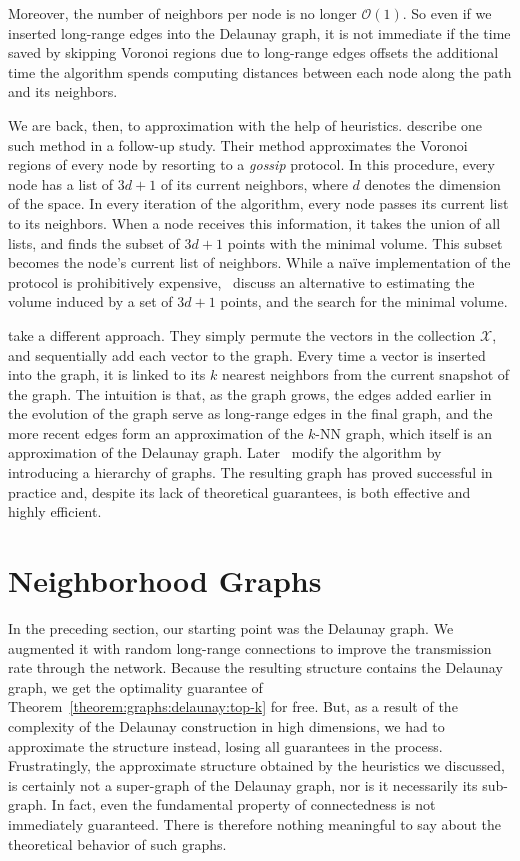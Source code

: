 \begin{svgraybox}
Moreover, the number of
neighbors per node is no longer $\mathcal{O}(1)$. So even if we inserted
long-range edges into the Delaunay graph, it is not immediate if the time
saved by skipping Voronoi regions due to long-range edges
offsets the additional time the algorithm
spends computing distances between each node along the path and its neighbors.
\end{svgraybox}

We are back, then, to approximation with the help of heuristics.
\cite{raynet2007} describe one such method in a follow-up study.
Their method approximates the Voronoi regions of every node by
resorting to a \emph{gossip} protocol. In this procedure, every node
has a list of $3d + 1$ of its current neighbors, where $d$ denotes the dimension
of the space. In every iteration of the algorithm,
every node passes its current list to its neighbors. When a node receives
this information, it takes the union of all lists, and finds the subset of
$3d + 1$ points with the minimal volume. This subset becomes the node's
current list of neighbors. While a na\"ive implementation of the protocol
is prohibitively expensive,~\cite{raynet2007} discuss an alternative to estimating
the volume induced by a set of $3d + 1$ points, and the search for the minimal volume.

\cite{nsw2014} take a different approach. They simply permute the vectors
in the collection $\mathcal{X}$, and sequentially add each vector to the graph. Every time
a vector is inserted into the graph, it is linked to its $k$ nearest neighbors
from the current snapshot of the graph.
The intuition is that, as the graph grows, the edges added earlier in the evolution
of the graph serve as long-range edges in the final graph,
and the more recent edges form an approximation
of the $k$-NN graph, which itself is an approximation of the Delaunay graph.
Later~\cite{hnsw2020} modify the algorithm by introducing a hierarchy of graphs.
The resulting graph has proved successful in practice and, despite its lack
of theoretical guarantees, is both effective and highly efficient.

\section{Neighborhood Graphs}

In the preceding section, our starting point was the Delaunay graph. We augmented it with
random long-range connections to improve the transmission rate through the network.
Because the resulting structure contains the Delaunay
graph, we get the optimality guarantee of Theorem~\ref{theorem:graphs:delaunay:top-k}
for free. But, as a result of the complexity of the Delaunay construction in high dimensions,
we had to approximate the structure instead, losing all guarantees in the process.
Frustratingly, the approximate structure obtained by the heuristics we discussed, is
certainly not a super-graph of the Delaunay graph, nor is it necessarily its sub-graph.
In fact, even the fundamental property of connectedness is not immediately guaranteed.
There is therefore nothing meaningful to say about the theoretical behavior of such graphs.


